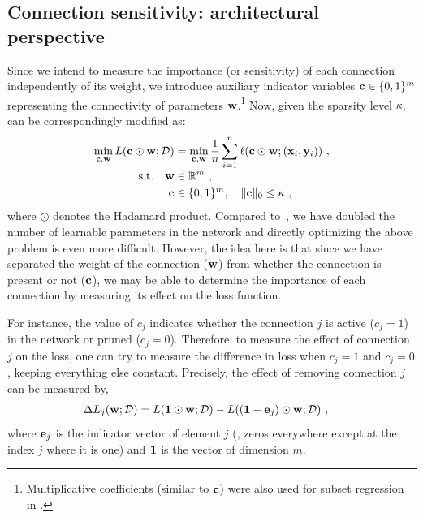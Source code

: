 \subsection{Connection sensitivity: architectural perspective}
Since we intend to measure the importance (or sensitivity) of each connection independently of its weight, we introduce auxiliary indicator variables ${\mathbf{c}}\in\{0,1\}^m$ representing the connectivity of parameters ${\mathbf{w}}$.\footnote{Multiplicative coefficients (similar to ${\mathbf{c}}$) were also used for subset regression in \cite{breiman1995better}.}
Now, given the sparsity level $\kappa$,~ can be correspondingly modified as:
\vspace{-1mm}
\begin{align}\label{eq:nnc}
\min_{{\mathbf{c}},{\mathbf{w}}} L({\mathbf{c}} \odot{\mathbf{w}}; {\mathcal{D}}) &= \min_{{\mathbf{c}},{\mathbf{w}}} \frac{1}{n} \sum_{i=1}^n
\ell({\mathbf{c}} \odot{\mathbf{w}}; ({\mathbf{x}}_i, {\mathbf{y}}_i))\ ,\\[-1mm]\nonumber 
\text{s.t.}\quad{\mathbf{w}} &\in \mathbb{R}^m \ ,\\\nonumber
{\mathbf{c}} &\in \{0,1\}^m, \quad \|{\mathbf{c}}\|_0 \le \kappa\ ,
\end{align}
where $\odot$ denotes the Hadamard product. 
Compared to~, we have doubled the number of learnable parameters in the network and directly optimizing the above problem is even more difficult.
However, the idea here is that since we have separated the weight of the connection (${\mathbf{w}}$) from whether the connection is present or not (${\mathbf{c}}$), we may be able to determine the importance of each connection by measuring its effect on the loss function.

For instance, the value of $c_j$ indicates whether the connection $j$ is active ($c_j = 1$) in the network or pruned ($c_j =0$).
Therefore, to measure the effect of connection $j$ on the loss, one can try to measure the difference in loss when $c_j=1$ and $c_j=0$, keeping everything else constant.
Precisely, the effect of removing connection $j$ can be measured by,
\begin{align}\label{eq:csd}
\Delta L_j({\mathbf{w}};{\mathcal{D}}) &= L(\boldsymbol{1} \odot{\mathbf{w}};{\mathcal{D}}) - L((\boldsymbol{1} - {\mathbf{e}}_j) \odot{\mathbf{w}};{\mathcal{D}})\ ,
\end{align}
where ${\mathbf{e}}_j$ is the indicator vector of element $j$ (\ie, zeros everywhere except at the index $j$ where it is one) and $\boldsymbol{1}$ is the vector of dimension $m$.

